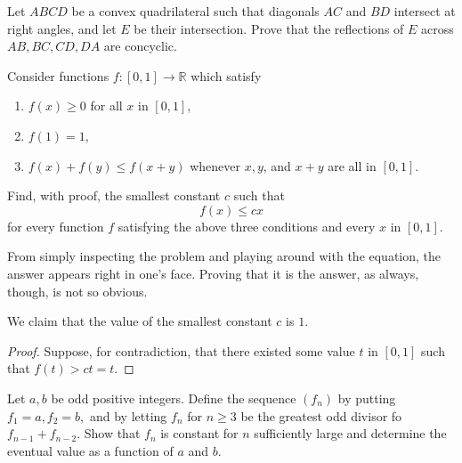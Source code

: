 \documentclass[a4paper, 10pt]{article}
\begin{document}
\begin{chirpbox}
\begin{problemnum}
    Let \( ABCD \) be a convex quadrilateral such that diagonals \( AC \) and \( BD \) intersect at right angles, and let \( E \) be their intersection. Prove that the reflections of \( E \) across \( AB, BC, CD, DA \) are concyclic. 
\end{problemnum}
\end{chirpbox}

\begin{chirpbox}
\begin{problemnum}
    Consider functions \( f : [0, 1] \to \mathbb{R} \) which satisfy
    \begin{enumerate}
        \item \( f(x) \ge 0 \) for all \( x \) in \( [0, 1] \),
        \item \( f(1) = 1 \),
        \item \( f(x) + f(y) \le f(x + y) \) whenever \( x, y \), and \( x + y \) are all in \( [0, 1] \).
    \end{enumerate}
    Find, with proof, the smallest constant \( c \) such that
    \[
        f(x) \le cx
    \]
    for every function \( f \) satisfying the above three conditions and every \( x \) in \( [0, 1] \).
\end{problemnum}
\end{chirpbox}

\begin{solution}
    From simply inspecting the problem and playing around with the equation, the answer appears right in one's face. Proving that it is the answer, as always, though, is not so obvious.
    \begin{claim}
        We claim that the value of the smallest constant \( c \) is \( 1 \).
    \end{claim}
    \begin{proof}
        Suppose, for contradiction, that there existed some value \( t \) in \(
        [0, 1] \) such that \( f(t) > ct = t \).
    \end{proof}
\end{solution}

\begin{chirpbox}
\begin{problemnum}
    Let \( a, b \) be odd positive integers. Define the sequence \( (f_n) \) by
    putting \( f_1 = a, f_2 = b, \) and by letting \( f_n \) for \( n \ge 3 \)
    be the greatest odd divisor fo \( f_{n-1} + f_{n-2} \). Show that \( f_n \)
    is constant for \( n \) sufficiently large and determine the eventual value
    as a function of \( a \) and \( b \).
\end{problemnum}
\end{chirpbox}
\end{document}
